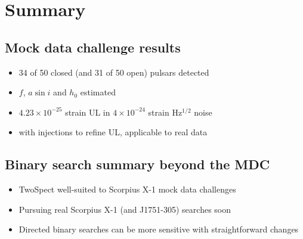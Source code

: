 \section{Summary}

\subsection{Mock data challenge results}

\begin{itemize}
\item 34 of 50 closed (and 31 of 50 open) pulsars detected
\item $f$, $a \sin i$ and $h_0$ estimated
\item $4.23\times 10^{-25}$ strain UL in $4 \times 10^{-24}$ strain Hz$^{1/2}$ noise
\item with injections to refine UL, applicable to real data
\end{itemize}

\subsection{Binary search summary beyond the MDC}
\begin{itemize}
\item TwoSpect well-suited to Scorpius X-1 mock data challenges
\item Pursuing real Scorpius X-1 (and J1751-305) searches soon
\item Directed binary searches can be more sensitive with straightforward
changes
\end{itemize}



%
%



